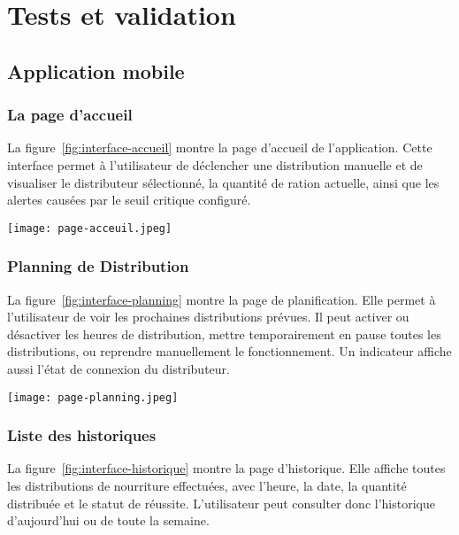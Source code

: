 
\pagestyle{fancy}
\fancyhead{} %
\chapter{Tests et validation}
\section{Application mobile}

\subsection{La page d'accueil}
La figure~\ref{fig:interface-accueil} montre la page d'accueil de l'application. Cette interface permet à l’utilisateur de déclencher une distribution manuelle et de visualiser le distributeur sélectionné, la quantité de ration actuelle, ainsi que les alertes causées par le seuil critique configuré.

\begin{minipage}{\linewidth}
  \centering
  \texttt{[image: page-acceuil.jpeg]}
  \label{fig:interface-accueil}
\end{minipage}

\subsection{Planning de Distribution}
La figure~\ref{fig:interface-planning} montre la page de planification. Elle permet à l'utilisateur de voir les prochaines distributions prévues. Il peut activer ou désactiver les heures de distribution, mettre temporairement en pause toutes les distributions, ou reprendre manuellement le fonctionnement. Un indicateur affiche aussi l’état de connexion du distributeur.

\begin{minipage}{\linewidth}
  \centering
  \texttt{[image: page-planning.jpeg]}
  \label{fig:interface-planning}
\end{minipage}

\subsection{Liste des historiques}
La figure~\ref{fig:interface-historique} montre la page d’historique. Elle affiche toutes les distributions de nourriture effectuées, avec l’heure, la date, la quantité distribuée et le statut de réussite. L’utilisateur peut consulter donc l’historique d’aujourd’hui ou de toute la semaine.

